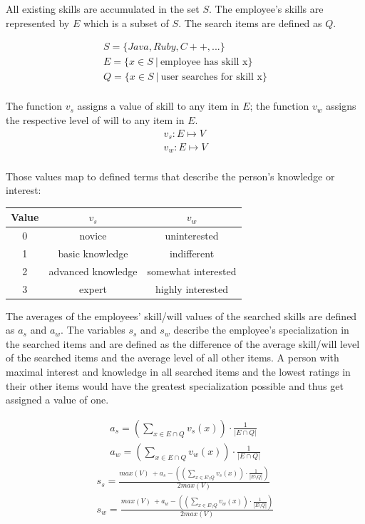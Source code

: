 All existing skills are accumulated in the set $S$. The employee's skills are represented by $E$ which is a subset of $S$. The search items are
defined as $Q$.

\begin{gather*}
  S = \{Java, Ruby, C++, ...\} \\
  E = \{x \in S \ | \ \textrm{employee has skill x}\} \\
  Q = \{x \in S \ | \ \textrm{user searches for skill x}\} \\
\end{gather*}

The function $v_s$ assigns a value of skill to any item in $E$; the function $v_w$ assigns the respective level of will to any item in $E$.
\begin{gather*}
  v_s: E \mapsto V \\
  v_w: E \mapsto V \\
\end{gather*}

Those values map to defined terms that describe the person's knowledge or interest:
\begin{center}
\begin{tabular}{c|c|c}
	Value & $v_s$ & $v_w$ \\
	\hline
	0 & novice & uninterested\\
	1 & basic knowledge & indifferent\\
	2 & advanced knowledge & somewhat interested\\
	3 & expert & highly interested\\
\end{tabular}
\end{center}

\newpage

The averages of the employees' skill/will values of the searched skills are defined as $a_s$ and $a_w$.
The variables $s_s$ and $s_w$ describe the employee's specialization in the searched items and are defined as the difference
of the average skill/will level of the searched items and the average level of all other items.
A person with maximal interest and knowledge in all searched items and the lowest ratings in their other items would have the greatest specialization possible and thus get assigned a value of one.

\begin{gather*}
  a_s = \left( \sum_{x \in E \cap Q} v_s(x) \right) \cdot \frac{1}{|E \cap Q|} \\
  a_w = \left( \sum_{x \in E \cap Q} v_w(x) \right) \cdot \frac{1}{|E \cap Q|}
\end{gather*}
\begin{gather*}
  s_s = \frac{max(V) \ + a_s - \left( \left( \sum_{x \in E \setminus Q} v_s(x)\right) \cdot \frac{1}{|E \setminus Q|} \right)}{2 max(V)}\\
  s_w = \frac{max(V) \ + a_w - \left( \left( \sum_{x \in E \setminus Q} v_w(x)\right) \cdot \frac{1}{|E \setminus Q|} \right)}{2 max(V)}
\end{gather*}

